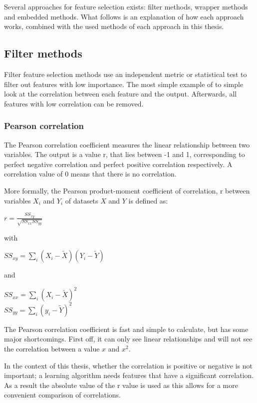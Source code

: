 \npar

Several approaches for feature selection exists: filter methods, wrapper methods and embedded methods. What follows is an explanation of how each approach works, combined with the used methods of each approach in this thesis.

\subsection{Filter methods}
Filter feature selection methods use an independent metric or statistical test to filter out features with low importance. The most simple example of to simple look at the correlation between each feature and the output. Afterwards, all features with low correlation can be removed.

\subsubsection{Pearson correlation}
The Pearson correlation coefficient measures the linear relationship between two variables. The output is a value r, that lies between -1 and 1, corresponding to perfect negative correlation and perfect positive correlation respectively. A correlation value of 0 means that there is no correlation.

\npar

More formally\citep{corrPaper}, the Pearson product-moment coefficient of correlation, r between variables $X_i$ and $Y_i$ of datasets $X$ and $Y$ is defined as:

\begin{center}
$r = \frac{SS_{xy}}{\sqrt{SS_{xx}SS_{yy}}}$
\end{center}
with
\begin{center}
$SS_{xy} = \sum\limits_i (X_i-\tilde{X})(Y_i-\tilde{Y})$
\end{center}
and
\begin{center}
$SS_{xx} = \sum\limits_i (X_i-\tilde{X})^2$ \\
$SS_{yy} = \sum\limits_i (y_i-\tilde{Y})^2$
\end{center}

\npar

The Pearson correlation coefficient is fast and simple to calculate, but has some major shortcomings. First off, it can only see linear relationships and will not see the correlation between a value $x$ and $x^2$.

\npar

In the context of this thesis, whether the correlation is positive or negative is not important; a learning algorithm needs features that have a significant correlation. As a result the absolute value of the r value is used as this allows for a more convenient comparison of correlations.

